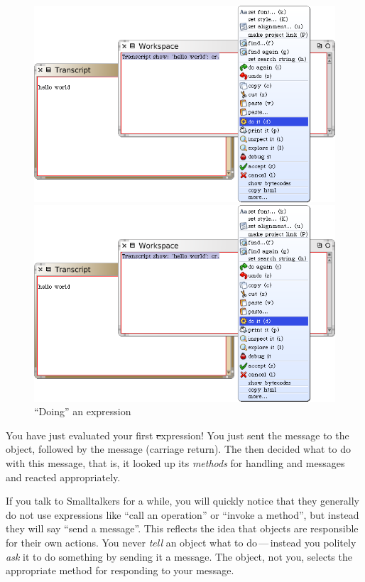 \documentclass[a4paper,10pt,twoside]{book}
\begin{document}
\begin{figure}[htb]
\ifluluelse
	{\centerline {\includegraphics[width=\textwidth]{Doit}}}
	{\centerline {\includegraphics[scale=0.7]{Doit}}}
\caption{``Doing'' an expression\label{fig:doit}}
\end{figure}

You have just evaluated your first \st expression!
You just sent the message  to the  object, followed by the message  (carriage return).
The  then decided what to do with this message, that is, it looked up its \emph{methods} for handling  and  messages and reacted appropriately.

If you talk to Smalltalkers for a while, you will quickly notice that they generally do not use expressions like ``call an operation'' or ``invoke a method'', but instead they will say ``send a message''.
This reflects the idea that objects are responsible for their own actions. 
You never \emph{tell} an object what to do\,---\,instead you politely \emph{ask} it to do something by sending it a message. 
The object, not you, selects the appropriate method for responding to your message.
\end{document}

